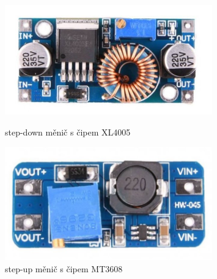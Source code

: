 \begin{figure}[htb]
  \centering
  \begin{minipage}{0.45\textwidth}
    \centering
  \includegraphics[width=0.8\textwidth]{img/XL4005.jpg}
  \caption{\label{fig:XL4005} step-down měnič s čipem XL4005~\cite{laskakit-XL4005}}
  \end{minipage}\hfill
  \begin{minipage}{0.45\textwidth}
    \centering
  \includegraphics[width=0.8\textwidth]{img/MT3608.jpg}
  \caption{\label{fig:MT3608} step-up měnič s čipem MT3608~\cite{laskakit-MT3608}}
  \end{minipage}
\end{figure}
